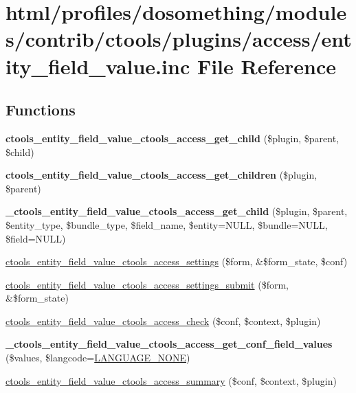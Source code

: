 \hypertarget{entity__field__value_8inc}{
\section{html/profiles/dosomething/modules/contrib/ctools/plugins/access/entity\_\-field\_\-value.inc File Reference}
\label{entity__field__value_8inc}
}
\subsection*{Functions}
\begin{DoxyCompactItemize}
\item 
\hypertarget{entity__field__value_8inc_a009ee5115bfee19f7282f2197e9f5225}{
{\bfseries ctools\_\-entity\_\-field\_\-value\_\-ctools\_\-access\_\-get\_\-child} (\$plugin, \$parent, \$child)}
\label{entity__field__value_8inc_a009ee5115bfee19f7282f2197e9f5225}

\item 
\hypertarget{entity__field__value_8inc_a7d5b8a7df5669bdd2777da1efa42bbf7}{
{\bfseries ctools\_\-entity\_\-field\_\-value\_\-ctools\_\-access\_\-get\_\-children} (\$plugin, \$parent)}
\label{entity__field__value_8inc_a7d5b8a7df5669bdd2777da1efa42bbf7}

\item 
\hypertarget{entity__field__value_8inc_aeffc815552912dace240f1cab75e5946}{
{\bfseries \_\-ctools\_\-entity\_\-field\_\-value\_\-ctools\_\-access\_\-get\_\-child} (\$plugin, \$parent, \$entity\_\-type, \$bundle\_\-type, \$field\_\-name, \$entity=NULL, \$bundle=NULL, \$field=NULL)}
\label{entity__field__value_8inc_aeffc815552912dace240f1cab75e5946}

\item 
\hyperlink{entity__field__value_8inc_a6de8332631f237ef4baaacc10ce923fc}{ctools\_\-entity\_\-field\_\-value\_\-ctools\_\-access\_\-settings} (\$form, \&\$form\_\-state, \$conf)
\item 
\hyperlink{entity__field__value_8inc_a8af33147764d3a5269cf91065f0ad712}{ctools\_\-entity\_\-field\_\-value\_\-ctools\_\-access\_\-settings\_\-submit} (\$form, \&\$form\_\-state)
\item 
\hyperlink{entity__field__value_8inc_a283742a7d2f2bd22e5c08fbd6cdb7300}{ctools\_\-entity\_\-field\_\-value\_\-ctools\_\-access\_\-check} (\$conf, \$context, \$plugin)
\item 
\hypertarget{entity__field__value_8inc_acb2d324d8b8c9221ecf8b09c1d568cf1}{
{\bfseries \_\-ctools\_\-entity\_\-field\_\-value\_\-ctools\_\-access\_\-get\_\-conf\_\-field\_\-values} (\$values, \$langcode=\hyperlink{bootstrap_8inc_a9e91e2136aa0ce5c5e80f06aa3ad8266}{LANGUAGE\_\-NONE})}
\label{entity__field__value_8inc_acb2d324d8b8c9221ecf8b09c1d568cf1}

\item 
\hyperlink{entity__field__value_8inc_ad084c59021feb9bfa727b3c62476ccf7}{ctools\_\-entity\_\-field\_\-value\_\-ctools\_\-access\_\-summary} (\$conf, \$context, \$plugin)
\end{DoxyCompactItemize}
